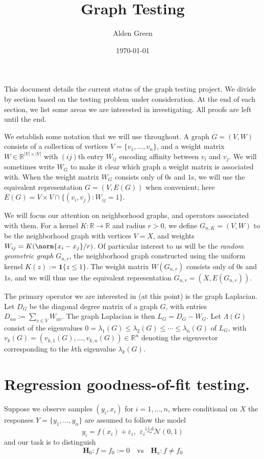 \documentclass{article}
\newcommand{\Reals}{\mathbb{R}}
\newcommand{\abs}[1]{\left \lvert #1 \right \rvert}
\newcommand{\1}{\mathbf{1}}
\theoremstyle{alden}
\theoremstyle{aldenthm}
\theoremstyle{definition}
\theoremstyle{remark}
\begin{document}
\title{Graph Testing}
\author{Alden Green}
\date{\today}
\maketitle

This document details the current status of the graph testing project. We divide by section based on the testing problem under consideration. At the end of each section, we list some areas we are interested in investigating. All proofs are left until the end.

We establish some notation that we will use throughout. A graph $G = (V,W)$ consists of a collection of vertices $V = \{v_1,\ldots,v_n\}$, and a weight matrix $W \in \Reals^{\abs{V} \times \abs{V}}$ with $(ij)$th entry $W_{ij}$ encoding affinity between $v_i$ and $v_j$. We will sometimes write $W_G$ to make it clear which graph a weight matrix is associated with. When the weight matrix $W_G$ consists only of $0$s and $1$s, we will use the equivalent representation $G = (V,E(G))$ when convenient; here $E(G) = V \times V \cap \{(v_i,v_j): W_{ij} = 1\}$. 

We will focus our attention on neighborhood graphs, and operators associated with them. For a kernel $K:\Reals \to \Reals$ and radius $r > 0$, we define $G_{n,K}=(V,W)$ to be the neighborhood graph with vertices $V = X$, and weights $W_{ij} = K(\norm{x_i - x_j}/r)$. Of particular interest to us will be the \emph{random geometric graph} $G_{n,r}$, the neighborhood graph constructed using the uniform kernel $K(z) := \1\{z \leq 1\}$. The weight matrix $W(G_{n,r})$ consists only of $0$s and $1$s, and we will thus use the equivalent representation $G_{n,r} = (X,E(G_{n,r}))$.

The primary operator we are interested in (at this point) is the graph Laplacian. Let $D_G$ be the diagonal degree
matrix of a graph $G$, with entries $D_{uu} := \sum_{v \in V} W_{uv}$. The graph Laplacian is then $L_G = D_G - W_G$. Let $\Lambda(G)$ consist of the eigenvalues $0 = \lambda_1(G) \leq \lambda_2(G) \leq \cdots \leq \lambda_n(G)$ of $L_G$, with $v_k(G) = (v_{k,1}(G),\ldots,v_{k,n}(G)) \in \Reals^n$ denoting the eigenvector corresponding to the $k$th eigenvalue $\lambda_k(G)$.  

\section{Regression goodness-of-fit testing.}

Suppose we observe samples $(y_i,x_i)$ for $i = 1,\ldots,n$, where conditional on $X$ the responses $Y = \{y_1,\ldots,y_n\}$ are assumed to follow the model
\begin{equation}
\label{eqn:regression_known_variance}
y_i = f(x_i) + \varepsilon_i, ~~ \varepsilon_i \overset{\textrm{i.i.d}}{\sim} \mathcal{N}(0,1)
\end{equation} 
and our task is to distinguish
\begin{equation*}
\mathbf{H}_0: f = f_0 := 0 \quad \textrm{vs} \quad \mathbf{H}_{\textrm{a}}: f \neq f_0
\end{equation*}
\end{document}
